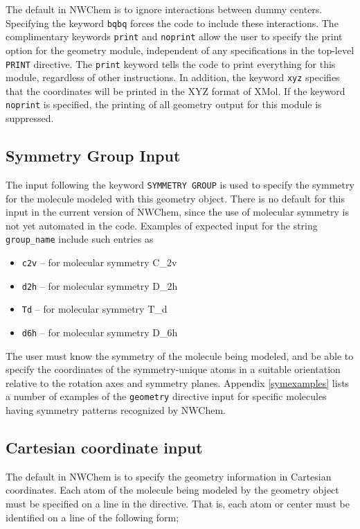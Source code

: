 The default in NWChem is to ignore interactions between dummy centers. 
Specifying the keyword \verb+bqbq+ forces the code to include these 
interactions.  The complimentary keywords \verb+print+ and \verb+noprint+
allow the user to specify the print option for the geometry module, 
independent of any specifications in the top-level \verb+PRINT+ directive.
The \verb+print+ keyword tells the code to print everything for this
module, regardless of other instructions.  In addition, the keyword
\verb+xyz+ specifies that the coordinates will be printed in the XYZ
format of XMol.  If the keyword \verb+noprint+ is specified, the printing
of all geometry output for this module is suppressed.

\subsection{Symmetry Group Input}

The input following the keyword \verb+SYMMETRY GROUP+ is used to specify
the symmetry for the molecule modeled with this geometry object.
There is no default for this input in the current version of NWChem, since
the use of molecular symmetry is not yet automated in the code.
Examples of expected input for the string \verb+group_name+ include
such entries as

\begin{itemize}
\item \verb+c2v+ -- for molecular symmetry C\_{2v}
\item \verb+d2h+ -- for molecular symmetry D\_{2h}
\item \verb+Td+ -- for molecular symmetry T\_{d}
\item \verb+d6h+ -- for molecular symmetry D\_{6h}
\end{itemize}

The user must know the symmetry of the molecule being modeled, and be able
to specify the
coordinates of the symmetry-unique atoms in a suitable orientation
relative to the rotation axes and symmetry planes.  
Appendix \ref{symexamples} lists a number of examples of the \verb+geometry+
directive input for specific molecules having symmetry patterns recognized
by NWChem.

\subsection{Cartesian coordinate input}
\label{sec:cart}

The default in NWChem is to specify the geometry information in Cartesian 
coordinates.  Each atom of the molecule being modeled by the geometry
object must be specified on a line in the directive.  That is, each atom
or center
must be identified on a line of the following form;

